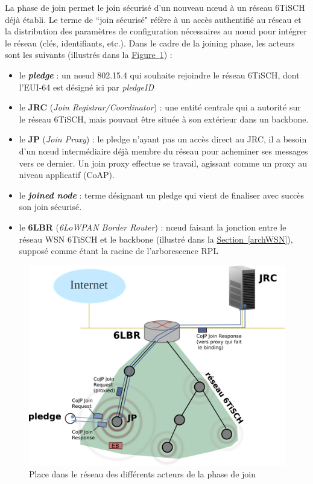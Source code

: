 \documentclass[]{report}
\newcommand{\wordlink}[2]{\hyperref[#2]{#1~\ref{#2}}}
\begin{document}
La phase de join permet le join sécurisé d'un nouveau nœud à un réseau 6TiSCH déjà établi. Le terme de ``join sécurisé" réfère à un accès authentifié au réseau et la distribution des paramètres de configuration nécessaires au nœud pour intégrer le réseau (clés, identifiants, etc.). Dans le cadre de la joining phase, les acteurs sont les suivants (illustrés dans la \wordlink{Figure}{fig:joining_phase_network}) :
\vspace{0.1cm}
\begin{itemize}[label=$\bullet$]
\item le \textit{\textbf{pledge}} : un nœud 802.15.4 qui souhaite rejoindre le réseau 6TiSCH, dont l'EUI-64 est désigné ici par \textit{pledgeID}
\item le \textbf{JRC} (\textit{Join Registrar/Coordinator}) : une entité centrale qui a autorité sur le réseau 6TiSCH, mais pouvant être située à son extérieur dans un backbone.
\item le \textbf{JP} (\textit{Join Proxy}) : le pledge n'ayant pas un accès direct au JRC, il a besoin d'un nœud intermédiaire déjà membre du réseau pour acheminer ses messages vers ce dernier. Un join proxy effectue se travail, agissant comme un proxy au niveau applicatif (CoAP). 
\item le \textit{\textbf{joined node}} : terme désignant un pledge qui vient de finaliser avec succès son join sécurisé.
\item le \textbf{6LBR} (\textit{6LoWPAN Border Router}) : nœud faisant la jonction entre le réseau WSN 6TiSCH et le backbone (illustré dans la \wordlink{Section}{archWSN}), supposé comme étant la racine de l'arborescence RPL 
\end{itemize}

	\begin{figure}[!h]
	\centering
	\includegraphics[width=0.73\linewidth]{Joining_phase_network}
	\caption{Place dans le réseau des différents acteurs de la phase de join}
	\label{fig:joining_phase_network}
	\end{figure}
\end{document}
